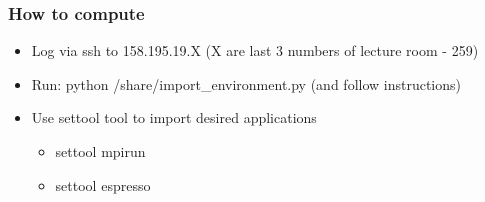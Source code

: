 \documentclass{beamer}
\begin{document}
\begin{frame}
  \frametitle{How to compute}
  \begin{itemize}
    \item Log via ssh to 158.195.19.X (X are last 3 numbers of lecture room - 259)
    \item Run: python /share/import\_environment.py (and follow instructions)
    \item Use settool tool to import desired applications
    \begin{itemize}
      \item settool mpirun
      \item settool espresso
    \end{itemize}
  \end{itemize}
\end{frame}
\end{document}
